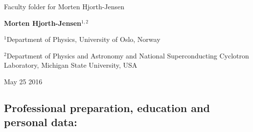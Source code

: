 \documentclass[%
oneside,                 %
final,                   %
10pt]{article}
\begin{document}

\newcommand{\exercisesection}[1]{\subsection*{#1}}






\thispagestyle{empty}

\begin{center}
{\LARGE\bf
\begin{spacing}{1.25}
Faculty folder for Morten Hjorth-Jensen
\end{spacing}
}
\end{center}


\begin{center}
{\bf Morten Hjorth-Jensen${}^{1, 2}$} \\ [0mm]
\end{center}

\begin{center}
\centerline{{\small ${}^1$Department of Physics, University of Oslo, Norway}}
\centerline{{\small ${}^2$Department of Physics and Astronomy and National Superconducting Cyclotron Laboratory, Michigan State University, USA}}
\end{center}
    

\begin{center}
May 25 2016
\end{center}

\vspace{1cm}


\subsection*{Professional preparation, education  and personal data:}
\end{document}
